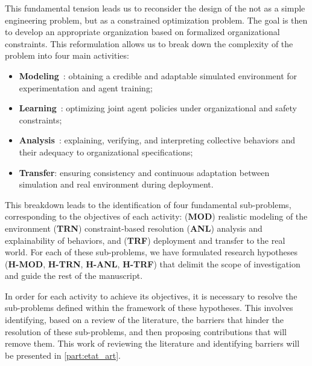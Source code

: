 This fundamental tension leads us to reconsider the design of the  not as a simple engineering problem, but as a constrained optimization problem. The goal is then to develop an appropriate organization based on formalized organizational constraints. This reformulation allows us to break down the complexity of the problem into four main activities:
\begin{itemize}
  \item \textbf{Modeling}~: obtaining a credible and adaptable simulated environment for experimentation and agent training;
  \item \textbf{Learning}~: optimizing joint agent policies under organizational and safety constraints;
  \item \textbf{Analysis}~: explaining, verifying, and interpreting collective behaviors and their adequacy to organizational specifications;
  \item \textbf{Transfer}: ensuring consistency and continuous adaptation between simulation and real environment during deployment.
\end{itemize}
This breakdown leads to the identification of four fundamental sub-problems, corresponding to the objectives of each activity: (\textbf{MOD}) realistic modeling of the environment (\textbf{TRN}) constraint-based resolution (\textbf{ANL}) analysis and explainability of behaviors, and (\textbf{TRF}) deployment and transfer to the real world. For each of these sub-problems, we have formulated research hypotheses (\textbf{H-MOD}, \textbf{H-TRN}, \textbf{H-ANL}, \textbf{H-TRF}) that delimit the scope of investigation and guide the rest of the manuscript.

In order for each activity to achieve its objectives, it is necessary to resolve the sub-problems defined within the framework of these hypotheses. This involves identifying, based on a review of the literature, the barriers that hinder the resolution of these sub-problems, and then proposing contributions that will remove them. This work of reviewing the literature and identifying barriers will be presented in \autoref{part:etat_art}.